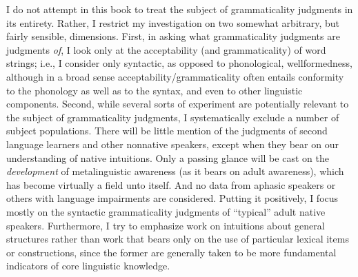 I do not attempt in this book to treat the subject of grammaticality judgments in its entirety. Rather, I restrict my investigation on two somewhat arbitrary, but fairly sensible, dimensions. First, in asking what grammaticality judgments are judgments \textit{of}, I look only at the acceptability (and grammaticality) of word strings; i.e., I consider only syntactic, as opposed to phonological, wellformedness, although in a broad sense acceptability/grammaticality often entails conformity to the phonology as well as to the syntax, and even to other linguistic components. Second, while several sorts of experiment are potentially relevant to the subject of grammaticality judgments, I systematically exclude a number of subject populations. There will be little mention of the judgments of second language learners and other nonnative speakers, except when they bear on our understanding of native intuitions. Only a passing glance will be cast on the \textit{development} of metalinguistic awareness (as it bears on adult awareness), which has become virtually a field unto itself. And no data from aphasic speakers or others with language impairments are considered. Putting it positively, I focus mostly on the syntactic grammaticality judgments of ``typical'' adult native speakers. Furthermore, I try to emphasize work on intuitions about general structures rather than work that bears only on the use of particular lexical items or constructions, since the former are generally taken to be more fundamental indicators of core linguistic knowledge.

